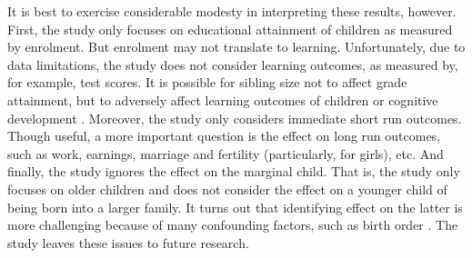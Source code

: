 It is best to exercise considerable modesty in interpreting these results, however. First, the study only focuses on educational attainment of children as measured by enrolment. But enrolment may not translate to learning. Unfortunately, due to data limitations, the study does not consider learning outcomes, as measured by, for example, test scores. It is possible for sibling size not to affect grade attainment, but to adversely affect learning outcomes of children or cognitive development \parencite{Black2010}. Moreover, the study only considers immediate short run outcomes. Though useful, a more important question is the effect on long run outcomes, such as work, earnings, marriage and fertility (particularly, for girls), etc. And finally, the study ignores the effect on the marginal child. That is, the study only focuses on older children and does not consider the effect on a younger child of being born into a larger family. It turns out that identifying effect on the latter is more challenging because of many confounding factors, such as birth order \parencite{Black2005}. The study leaves these issues to future research.  












